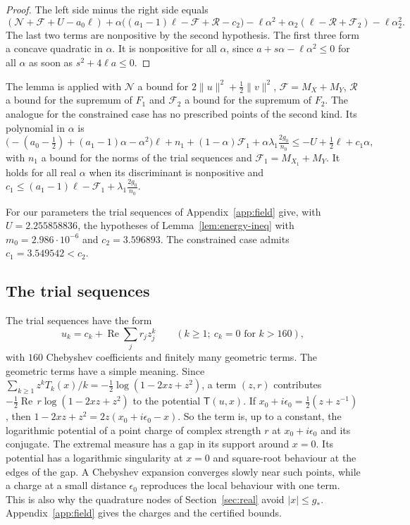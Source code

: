 \documentclass[11pt]{amsart}
\newcommand{\Ctwo}{3.596893}
\newcommand{\Cone}{3.549542}
\newcommand{\Utarget}{2.255858836}
\newcommand{\Kcoef}{160}
\newcommand{\Mmargin}{2.986\cdot10^{-6}}
\theoremstyle{definition}
\theoremstyle{remark}
\numberwithin{equation}{section}
\begin{document}
\begin{proof}
The left side minus the right side equals
\[
 (\mathcal N+\mathcal F+U-a_0\ell)+\alpha\bigl((a_1-1)\ell-\mathcal F+\mathcal R-c_2\bigr)-\ell\alpha^2
 +\alpha_2(\ell-\mathcal R+\mathcal F_2)-\ell\alpha_2^2 .
\]
The last two terms are nonpositive by the second hypothesis. The first three form a concave quadratic in
$\alpha$. It is nonpositive for all $\alpha$, since $a+s\alpha-\ell\alpha^2\le0$ for all $\alpha$ as soon as
$s^2+4\ell a\le0$.
\end{proof}

The lemma is applied with $\mathcal N$ a bound for $2\|u\|^2+\frac12\|v\|^2$, $\mathcal F=M_X+M_Y$,
$\mathcal R$ a bound for the supremum of $F_1$ and $\mathcal F_2$ a bound for the supremum of $F_2$. The
analogue for the constrained case has no prescribed points of the second kind. Its polynomial in $\alpha$ is
\[
 \bigl(-(a_0-\tfrac12)+(a_1-1)\alpha-\alpha^2\bigr)\ell+n_1+(1-\alpha)\mathcal F_1+\alpha\lambda_1\tfrac{2g_0}{n_0}
 \le-U+\tfrac12\ell+c_1\alpha,
\]
with $n_1$ a bound for the norms of the trial sequences and $\mathcal F_1=M_{X_1}+M_Y$. It holds for all real
$\alpha$ when its discriminant is nonpositive and $c_1\le(a_1-1)\ell-\mathcal F_1+\lambda_1\tfrac{2g_0}{n_0}$.

For our parameters the trial sequences of Appendix~\ref{app:field} give, with $U=\Utarget$, the hypotheses of
Lemma~\ref{lem:energy-ineq} with $m_0=\Mmargin$ and $c_2=\Ctwo$. The constrained case admits $c_1=\Cone<c_2$.

\subsection{The trial sequences}\label{ssec:trials}
The trial sequences have the form
\begin{equation}\label{eq:trial}
 u_k=c_k+\operatorname{Re}\sum_jr_jz_j^k\qquad(k\ge1;\ c_k=0\text{ for }k>\Kcoef),
\end{equation}
with $\Kcoef$ Chebyshev coefficients and finitely many geometric terms. The geometric terms have a simple
meaning. Since $\sum_{k\ge1}z^kT_k(x)/k=-\frac12\log(1-2xz+z^2)$, a term $(z,r)$ contributes
$-\frac12\operatorname{Re}\,r\log(1-2xz+z^2)$ to the potential $\mathsf T(u,x)$. If
$x_0+i\epsilon_0=\frac12(z+z^{-1})$, then $1-2xz+z^2=2z(x_0+i\epsilon_0-x)$. So the term is, up to a constant,
the logarithmic potential of a point charge of complex strength $r$ at $x_0+i\epsilon_0$ and its conjugate. The
extremal measure has a gap in its support around $x=0$. Its potential has a logarithmic singularity at $x=0$
and square-root behaviour at the edges of the gap. A Chebyshev expansion converges slowly near such points,
while a charge at a small distance $\epsilon_0$ reproduces the local behaviour with one term. This is also why
the quadrature nodes of Section~\ref{sec:real} avoid $|x|\le g_*$. Appendix~\ref{app:field} gives the charges
and the certified bounds.
\end{document}
